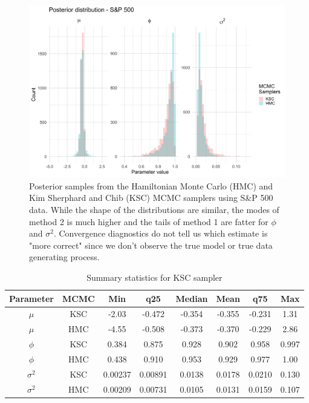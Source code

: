 \documentclass[12pt, a4paper]{article}
\begin{document}
    \begin{figure}[h]
        \centering
        \includegraphics[scale=0.1]{motivating_example/real_data_ex.png}
        \caption{Posterior samples from the Hamiltonian Monte Carlo (HMC) and Kim Sherphard and Chib (KSC) MCMC samplers using S\&P 500 data. While the shape of the distributions are similar, the modes of method 2 is much higher and the tails of method 1 are fatter for $\phi$ and $\sigma^2$. Convergence diagnostics do not tell us which estimate is "more correct" since we don't observe the true model or true data generating process.}
        \label{fig:realdataex}
    \end{figure}

    \begin{table}[H]
        \centering
        \begin{tabular}{|c|c|c|c|c|c|c|c|} \hline 
        Parameter&  MCMC&Min& q25&  Median& Mean & q75&Max\\ \hline 
        $\mu$&  KSC&-2.03 & -0.472 & -0.354 & -0.355 & -0.231 & 1.31 \\
     $\mu$&  HMC&-4.55 & -0.508 & -0.373 & -0.370 & -0.229 &2.86  \\\hline 
     $\phi$&  KSC&0.384 & 0.875 & 0.928 & 0.902 & 0.958 & 0.997 \\
     $\phi$&  HMC&0.438 & 0.910 & 0.953 & 0.929 & 0.977 &1.00  \\ \hline 
     $\sigma^2$&  KSC&0.00237 & 0.00891 & 0.0138 & 0.0178 & 0.0210 & 0.130 \\ 
     $\sigma^2$&  HMC&0.00209 & 0.00731 & 0.0105 & 0.0131 & 0.0159 &0.107 \\ \hline
        \end{tabular}
        \caption{Summary statistics for KSC sampler}
        \label{tab:realdata}
    \end{table}
    
\end{document}
